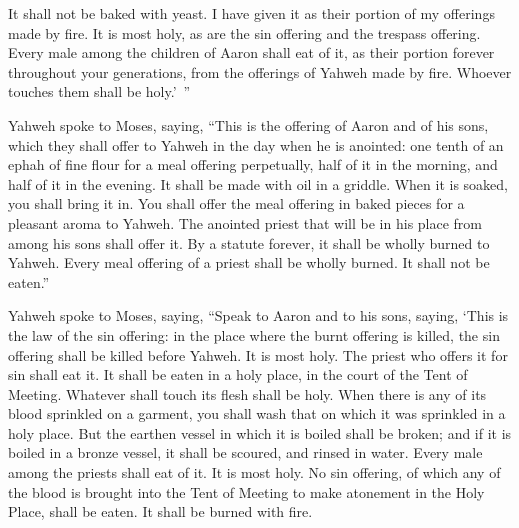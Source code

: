{It shall not be baked with yeast. I have given it as their portion of my offerings made by fire. It is most holy, as are the sin offering and the trespass offering.
Every male among the children of Aaron shall eat of it, as their portion forever throughout your generations, from the offerings of Yahweh made by fire. Whoever touches them shall be holy.’ ”
\par }{\PP {}Yahweh spoke to Moses, saying,
“This is the offering of Aaron and of his sons, which they shall offer to Yahweh in the day when he is anointed: one tenth of an ephah of fine flour for a meal offering perpetually, half of it in the morning, and half of it in the evening.
It shall be made with oil in a griddle. When it is soaked, you shall bring it in. You shall offer the meal offering in baked pieces for a pleasant aroma to Yahweh.
The anointed priest that will be in his place from among his sons shall offer it. By a statute forever, it shall be wholly burned to Yahweh.
Every meal offering of a priest shall be wholly burned. It shall not be eaten.”
\par }{\PP {}Yahweh spoke to Moses, saying,
“Speak to Aaron and to his sons, saying, ‘This is the law of the sin offering: in the place where the burnt offering is killed, the sin offering shall be killed before Yahweh. It is most holy.
The priest who offers it for sin shall eat it. It shall be eaten in a holy place, in the court of the Tent of Meeting.
Whatever shall touch its flesh shall be holy. When there is any of its blood sprinkled on a garment, you shall wash that on which it was sprinkled in a holy place.
But the earthen vessel in which it is boiled shall be broken; and if it is boiled in a bronze vessel, it shall be scoured, and rinsed in water.
Every male among the priests shall eat of it. It is most holy.
No sin offering, of which any of the blood is brought into the Tent of Meeting to make atonement in the Holy Place, shall be eaten. It shall be burned with fire.

}
